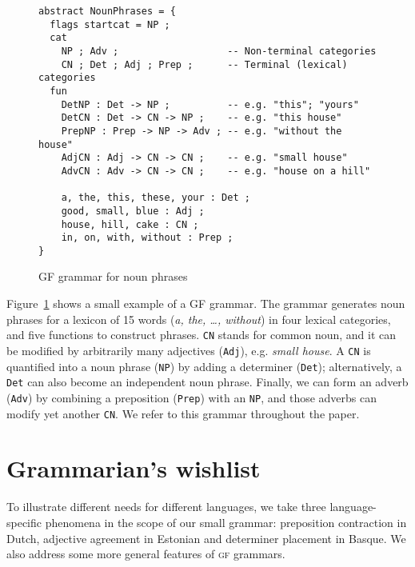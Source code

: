 \documentclass[11pt]{article}
\def\t#1{\texttt{#1}}
\def\gf{\textsc{gf}}
\begin{document}
\begin{figure}[h]
  \centering
\begin{verbatim}
abstract NounPhrases = {
  flags startcat = NP ;
  cat
    NP ; Adv ;                   -- Non-terminal categories
    CN ; Det ; Adj ; Prep ;      -- Terminal (lexical) categories
  fun
    DetNP : Det -> NP ;          -- e.g. "this"; "yours"
    DetCN : Det -> CN -> NP ;    -- e.g. "this house"
    PrepNP : Prep -> NP -> Adv ; -- e.g. "without the house"
    AdjCN : Adj -> CN -> CN ;    -- e.g. "small house"
    AdvCN : Adv -> CN -> CN ;    -- e.g. "house on a hill"

    a, the, this, these, your : Det ;
    good, small, blue : Adj ;
    house, hill, cake : CN ;
    in, on, with, without : Prep ; 
}
\end{verbatim}
  \caption{GF grammar for noun phrases}
\label{fig:exampleGrammar}
\end{figure}

Figure~\ref{fig:exampleGrammar} shows a small example of a GF
grammar. The grammar generates noun phrases for a lexicon of 15
words (\emph{a, the, \dots, without}) in four lexical categories,
and five functions to construct phrases.  
\t{CN} stands for common noun, and it can be modified by arbitrarily
many adjectives (\t{Adj}), e.g. \emph{small house}. A \t{CN} is
quantified into a noun phrase (\t{NP}) by adding a determiner
(\t{Det}); alternatively, a \t{Det} can also become
an independent noun phrase. Finally, we can form an
adverb (\t{Adv}) by combining a preposition (\t{Prep}) with an \t{NP}, and those adverbs can modify
yet another \t{CN}. 
We refer to this grammar throughout the paper.



\section{Grammarian's wishlist}

To illustrate different needs for different languages, we
take three language-specific phenomena in the scope of our
small grammar: preposition contraction in Dutch, adjective agreement
in Estonian and determiner placement in Basque.
We also address some more general features of \gf{} grammars.
\end{document}

